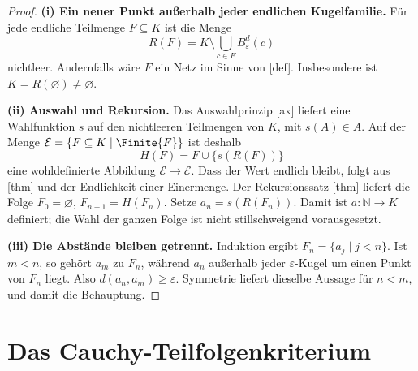 \begin{proof}
\noindent\textbf{(i) Ein neuer Punkt außerhalb jeder endlichen Kugelfamilie.}
Für jede endliche Teilmenge \(F\subseteq K\) ist die Menge
\[
 R(F)=K\setminus\bigcup_{c\in F}B_\varepsilon^d(c)
\]
nichtleer. Andernfalls wäre \(F\) ein Netz im Sinne von
[def]. Insbesondere ist
\(K=R(\varnothing)\ne\varnothing\).

\medskip\noindent\textbf{(ii) Auswahl und Rekursion.}
Das Auswahlprinzip [ax] liefert eine
Wahlfunktion \(s\) auf den nichtleeren Teilmengen von \(K\), mit
\(s(A)\in A\). Auf der Menge
\(\mathcal E=\{F\subseteq K\mid\Finite{F}\}\) ist deshalb
\[
 H(F)=F\cup\{s(R(F))\}
\]
eine wohldefinierte Abbildung \(\mathcal E\to\mathcal E\).
Dass der Wert endlich bleibt, folgt aus
[thm] und der Endlichkeit einer Einermenge.
Der Rekursionssatz [thm]
liefert die Folge \(F_0=\varnothing\), \(F_{n+1}=H(F_n)\).
Setze \(a_n=s(R(F_n))\). Damit ist \(a\colon\mathbb N\to K\)
definiert; die Wahl der ganzen Folge ist nicht stillschweigend vorausgesetzt.

\medskip\noindent\textbf{(iii) Die Abstände bleiben getrennt.}
Induktion ergibt \(F_n=\{a_j\mid j<n\}\). Ist \(m<n\), so gehört
\(a_m\) zu \(F_n\), während \(a_n\) außerhalb jeder
\(\varepsilon\)-Kugel um einen Punkt von \(F_n\) liegt. Also
\(d(a_n,a_m)\geq\varepsilon\). Symmetrie liefert dieselbe Aussage für
\(n<m\), und damit die Behauptung.
\end{proof}

\section{Das Cauchy-Teilfolgenkriterium}

